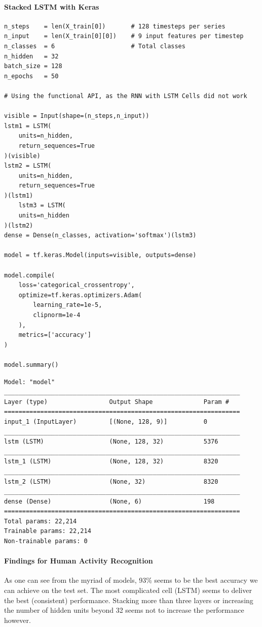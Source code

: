 \documentclass[11pt]{article}
\begin{document}
\paragraph{Stacked LSTM with Keras}
\begin{verbatim}
n_steps    = len(X_train[0])       # 128 timesteps per series
n_input    = len(X_train[0][0])    # 9 input features per timestep
n_classes  = 6                     # Total classes
n_hidden   = 32
batch_size = 128
n_epochs   = 50

# Using the functional API, as the RNN with LSTM Cells did not work

visible = Input(shape=(n_steps,n_input))
lstm1 = LSTM(
	units=n_hidden,
	return_sequences=True
)(visible)
lstm2 = LSTM(
	units=n_hidden,
	return_sequences=True
)(lstm1)
	lstm3 = LSTM(
	units=n_hidden
)(lstm2)
dense = Dense(n_classes, activation='softmax')(lstm3)

model = tf.keras.Model(inputs=visible, outputs=dense)

model.compile(
	loss='categorical_crossentropy',
	optimize=tf.keras.optimizers.Adam(
		learning_rate=1e-5,
		clipnorm=1e-4
	),
	metrics=['accuracy']
)

model.summary()
\end{verbatim}
\begin{small}
	\begin{verbatim}
Model: "model"
_________________________________________________________________
Layer (type)                 Output Shape              Param #   
=================================================================
input_1 (InputLayer)         [(None, 128, 9)]          0         
_________________________________________________________________
lstm (LSTM)                  (None, 128, 32)           5376      
_________________________________________________________________
lstm_1 (LSTM)                (None, 128, 32)           8320      
_________________________________________________________________
lstm_2 (LSTM)                (None, 32)                8320      
_________________________________________________________________
dense (Dense)                (None, 6)                 198       
=================================================================
Total params: 22,214
Trainable params: 22,214
Non-trainable params: 0
	\end{verbatim}
\end{small}

\paragraph{Findings for Human Activity Recognition}
As one can see from the myriad of models, 93\% seems to be the best accuracy we can achieve on the test set. The most complicated cell (LSTM) seems to deliver the best (consistent) performance. Stacking more than three layers or increasing the number of hidden units beyond 32 seems not to increase the performance however.
\end{document}
